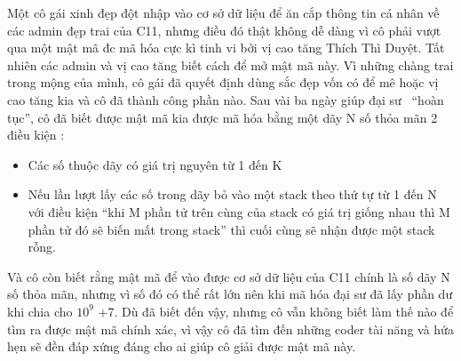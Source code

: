 Một cô gái xinh đẹp đột nhập vào cơ sở dữ liệu để ăn cắp thông tin cá nhân về các admin đẹp trai của C11, nhưng điều đó thật không dễ dàng vì cô phải vượt qua một mật mã đc mã hóa cực kì tinh vi bởi vị cao tăng Thích Thì Duyệt. Tất nhiên các admin và vị cao tăng biết cách để mở mật mã này. Vì những chàng trai trong mộng của mình, cô gái đã quyết định dùng sắc đẹp vốn có để mê hoặc vị cao tăng kia và cô đã thành công phần nào. Sau vài ba ngày giúp đại sư  “hoàn tục”, cô đã biết được mật mã kia được mã hóa bằng một dãy N số thỏa mãn 2 điều kiện :  
\begin{itemize}
	\item     Các số thuộc dãy có giá trị nguyên từ 1 đến K   
	\item     Nếu lần lượt lấy các số trong dãy bỏ vào một stack theo thứ tự từ 1 đến N  với điều kiện “khi M phần tử trên cùng của stack có giá trị giống nhau  thì M phần tử đó sẽ biến mất trong stack” thì cuối cùng sẽ nhận được một  stack rỗng.   
\end{itemize}

   Và cô còn biết rằng mật mã để vào được cơ sở dữ liệu của C11 chính là số dãy N số thỏa mãn, nhưng vì số đó có thể rất lớn nên khi mã hóa đại sư đã lấy phần dư khi chia cho $10^{9}$   +7. Dù đã biết đến vậy, nhưng cô vẫn không biết làm thế nào để tìm ra được mật mã chính xác, vì vậy cô đã tìm đến những coder tài năng và hứa hẹn sẽ đền đáp xứng đáng cho ai giúp cô giải được mật mã này.